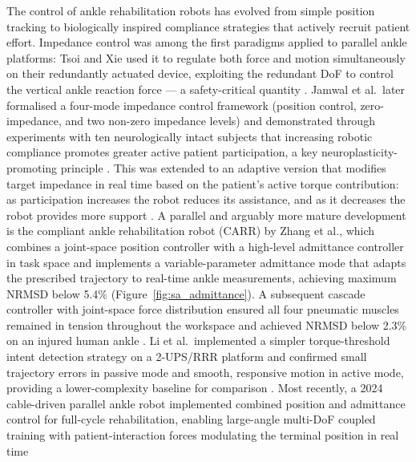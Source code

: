 The control of ankle rehabilitation robots has evolved from simple position tracking to biologically inspired compliance strategies that actively recruit patient effort.
Impedance control was among the first paradigms applied to parallel ankle platforms: Tsoi and Xie used it to regulate both force and motion simultaneously on their redundantly actuated device, exploiting the redundant DoF to control the vertical ankle reaction force — a safety-critical quantity \cite{Tsoi2009}.
Jamwal et al.\ later formalised a four-mode impedance control framework (position control, zero-impedance, and two non-zero impedance levels) and demonstrated through experiments with ten neurologically intact subjects that increasing robotic compliance promotes greater active patient participation, a key neuroplasticity-promoting principle \cite{Jamwal2016}.
This was extended to an adaptive version that modifies target impedance in real time based on the patient's active torque contribution: as participation increases the robot reduces its assistance, and as it decreases the robot provides more support \cite{Jamwal2016}.
A parallel and arguably more mature development is the compliant ankle rehabilitation robot (CARR) by Zhang et al., which combines a joint-space position controller with a high-level admittance controller in task space and implements a variable-parameter admittance mode that adapts the prescribed trajectory to real-time ankle measurements, achieving maximum NRMSD below 5.4\% \cite{Zhang2018} (Figure~\ref{fig:sa_admittance}).
A subsequent cascade controller with joint-space force distribution ensured all four pneumatic muscles remained in tension throughout the workspace and achieved NRMSD below 2.3\% on an injured human ankle \cite{Zhang2019}.
Li et al.\ implemented a simpler torque-threshold intent detection strategy on a 2-UPS/RRR platform and confirmed small trajectory errors in passive mode and smooth, responsive motion in active mode, providing a lower-complexity baseline for comparison \cite{Li2020passive}.
Most recently, a 2024 cable-driven parallel ankle robot implemented combined position and admittance control for full-cycle rehabilitation, enabling large-angle multi-DoF coupled training with patient-interaction forces modulating the terminal position in real time %

